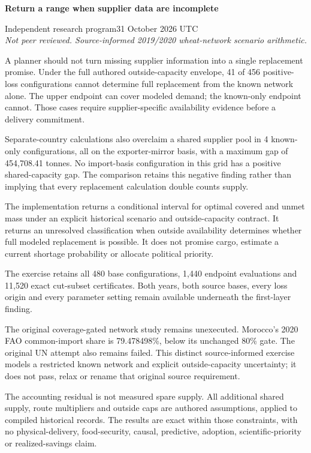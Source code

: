\documentclass[11pt,letterpaper]{article}
\newcommand{\heading}[1]{\vspace{4pt}{\large\bfseries #1}\par}
\newcommand{\BoundA}{41}
\newcommand{\BoundB}{456}
\newcommand{\BoundC}{4}
\newcommand{\BoundD}{454,708.41}
\newcommand{\BoundE}{480}
\newcommand{\BoundF}{1,440}
\newcommand{\BoundG}{11,520}
\newcommand{\BoundH}{79.478498}
\begin{document}
{\LARGE\bfseries Return a range when supplier data are incomplete\par}
\vspace{5pt}Independent research program\hfill 31 October 2026 UTC\\
\textit{Not peer reviewed. Source-informed 2019/2020 wheat-network scenario arithmetic.}

\heading{Practical finding}
A planner should not turn missing supplier information into a single replacement promise. Under the full authored outside-capacity envelope, \BoundA{} of \BoundB{} positive-loss configurations cannot determine full replacement from the known network alone. The upper endpoint can cover modeled demand; the known-only endpoint cannot. Those cases require supplier-specific availability evidence before a delivery commitment.

Separate-country calculations also overclaim a shared supplier pool in \BoundC{} known-only configurations, all on the exporter-mirror basis, with a maximum gap of \BoundD{} tonnes. No import-basis configuration in this grid has a positive shared-capacity gap. The comparison retains this negative finding rather than implying that every replacement calculation double counts supply.

\heading{What the product returns}
The implementation returns a conditional interval for optimal covered and unmet mass under an explicit historical scenario and outside-capacity contract. It returns an unresolved classification when outside availability determines whether full modeled replacement is possible. It does not promise cargo, estimate a current shortage probability or allocate political priority.

The exercise retains all \BoundE{} base configurations, \BoundF{} endpoint evaluations and \BoundG{} exact cut-subset certificates. Both years, both source bases, every loss origin and every parameter setting remain available underneath the first-layer finding.

\heading{An earlier failed question is preserved}
The original coverage-gated network study remains unexecuted. Morocco's 2020 FAO common-import share is \BoundH{}\%, below its unchanged 80\% gate. The original UN attempt also remains failed. This distinct source-informed exercise models a restricted known network and explicit outside-capacity uncertainty; it does not pass, relax or rename that original source requirement.

\heading{The important limitation}
The accounting residual is not measured spare supply. All additional shared supply, route multipliers and outside caps are authored assumptions, applied to compiled historical records. The results are exact within those constraints, with no physical-delivery, food-security, causal, predictive, adoption, scientific-priority or realized-savings claim.
\end{document}
